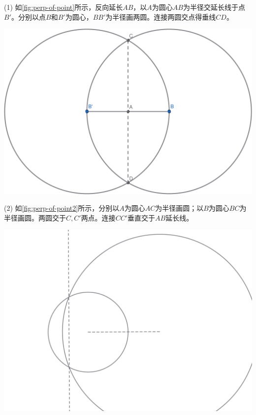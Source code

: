 \documentclass[b5paper]{ctexart}
\begin{document}
\begin{Answer}[ref={ex:irrationals}]
{(1) 如\cref{fig:perp-of-point}所示，反向延长$AB$，以$A$为圆心$AB$为半径交延长线于点$B'$。分别以点$B$和$B'$为圆心，$BB'$为半径画两圆。连接两圆交点得垂线$CD$。
\begin{center}
 \includegraphics[scale=0.3]{img/perp}
 \label{fig:perp-of-point}
\end{center}

(2) 如\cref{fig:perp-of-point2}所示，分别以$A$为圆心$AC$为半径画圆；以$B$为圆心$BC$为半径画圆。两圆交于$C, C'$两点。连接$CC'$垂直交于$AB$延长线。

\begin{center}
 \includegraphics[scale=0.3]{img/perp2}
 \label{fig:perp-of-point2}
\end{center}
}


\end{Answer}
\end{document}
